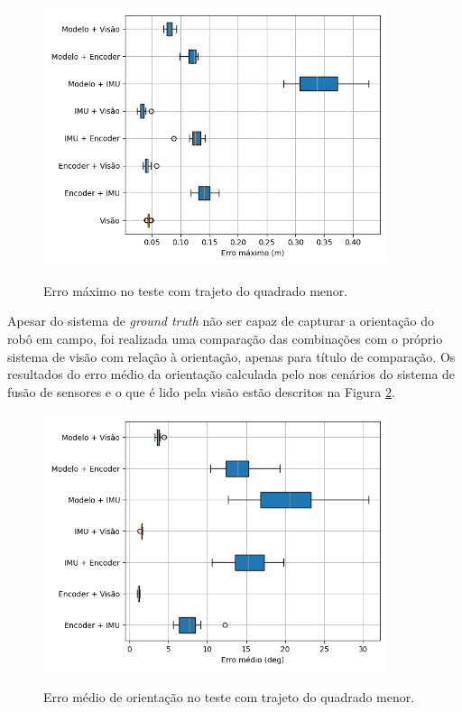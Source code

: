 \documentclass[acronym, symbols, table, deposito]{fei}
\begin{document}
	\begin{figure}[!htb]
		\centering
		\caption{Erro máximo no teste com trajeto do quadrado menor.}
		\includegraphics[width=0.9\textwidth]{../Dados/Graficos-Resultados/erro_maximo_distancia_quadrado_menor.png}
		\label{fig:erro_maximo_distancia_quad_menor}
	\end{figure}

	Apesar do sistema de \textit{ground truth} não ser capaz de capturar a orientação do robô em campo, foi realizada uma comparação das combinações com o próprio sistema de visão com relação à orientação, apenas para título de comparação. Os resultados do erro médio da orientação calculada pelo nos cenários do sistema de fusão de sensores e o que é lido pela visão estão descritos na Figura \ref{fig:erro_medio_orientacao_quad_menor}. 

	\begin{figure}[!htb]
		\centering
		\caption{Erro médio de orientação no teste com trajeto do quadrado menor.}
		\includegraphics[width=0.9\textwidth]{../Dados/Graficos-Resultados/erro_medio_orientacao_quadrado_menor.png}
		\label{fig:erro_medio_orientacao_quad_menor}
	\end{figure}
\end{document}
